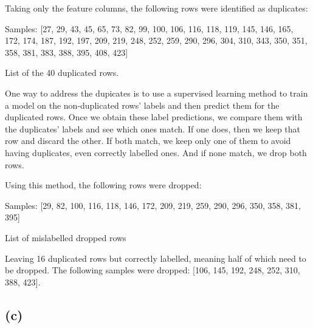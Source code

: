 \documentclass[12pt]{report} %
\begin{document}
Taking only the feature columns, the following rows were identified as duplicates:

\begin{table}[h]
\centering
Samples: [27, 29, 43, 45, 65, 73, 82, 99, 100, 106, 116, 118, 119, 145, 146, 165, 172, 174,
187, 192, 197, 209, 219, 248, 252, 259, 290, 296, 304, 310, 343, 350, 351, 358, 381, 383,
388, 395, 408, 423]

\caption{List of the 40 duplicated rows.}
\end{table}

One way to address the dupicates is to use a supervised learning method to train a model on the non-duplicated rows' labels and then predict them for the duplicated rows. Once we obtain these label predictions, we compare them with the duplicates' labels and see which ones match. If one does, then we keep that row and discard the other. If both match, we keep only one of them to avoid having duplicates, even correctly labelled ones. And if none match, we drop both rows.

Using this method, the following rows were dropped:

\begin{table}[h]
    \centering
    Samples: [29, 82, 100, 116, 118, 146, 172, 209, 219, 259, 290, 296, 350, 358, 381, 395]
    \caption{List of mislabelled dropped rows}
\end{table}

Leaving 16 duplicated rows but correctly labelled, meaning half of which need to be dropped. The following samples were dropped: [106, 145, 192, 248, 252, 310, 388, 423]. 

\subsection*{(c)}
\end{document}
